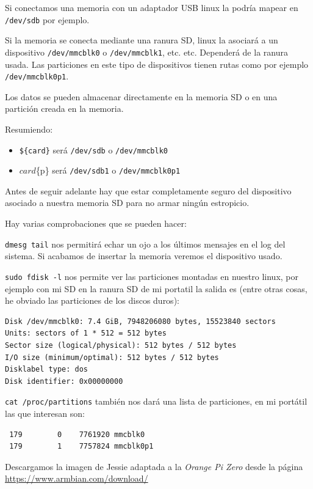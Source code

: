 \documentclass[12pt,spanish,]{article}
\providecommand{\tightlist}{%
  \setlength{\itemsep}{0pt}\setlength{\parskip}{0pt}}
\begin{document}
Si conectamos una memoria con un adaptador USB linux la podría mapear en
\texttt{/dev/sdb} por ejemplo.

Si la memoria se conecta mediante una ranura SD, linux la asociará a un
dispositivo \texttt{/dev/mmcblk0} o \texttt{/dev/mmcblk1}, etc. etc.
Dependerá de la ranura usada. Las particiones en este tipo de
dispositivos tienen rutas como por ejemplo \texttt{/dev/mmcblk0p1}.

Los datos se pueden almacenar directamente en la memoria SD o en una
partición creada en la memoria.

Resumiendo:

\begin{itemize}
\tightlist
\item
  \texttt{\$\{card\}} será \texttt{/dev/sdb} o \texttt{/dev/mmcblk0}
\item
  \({card}\)\{p\} será \texttt{/dev/sdb1} o \texttt{/dev/mmcblk0p1}
\end{itemize}

Antes de seguir adelante hay que estar completamente seguro del
dispositivo asociado a nuestra memoria SD para no armar ningún
estropicio.

Hay varias comprobaciones que se pueden hacer:

\texttt{dmesg\ \textbar{}tail} nos permitirá echar un ojo a los últimos
mensajes en el log del sistema. Si acabamos de insertar la memoria
veremos el dispositivo usado.

\texttt{sudo\ fdisk\ -l} nos permite ver las particiones montadas en
nuestro linux, por ejemplo con mi SD en la ranura SD de mi portatil la
salida es (entre otras cosas, he obviado las particiones de los discos
duros):

\begin{verbatim}
Disk /dev/mmcblk0: 7.4 GiB, 7948206080 bytes, 15523840 sectors
Units: sectors of 1 * 512 = 512 bytes
Sector size (logical/physical): 512 bytes / 512 bytes
I/O size (minimum/optimal): 512 bytes / 512 bytes
Disklabel type: dos
Disk identifier: 0x00000000
\end{verbatim}

\texttt{cat\ /proc/partitions} también nos dará una lista de
particiones, en mi portátil las que interesan son:

\begin{verbatim}
 179        0    7761920 mmcblk0
 179        1    7757824 mmcblk0p1
\end{verbatim}

Descargamos la imagen de Jessie adaptada a la \emph{Orange Pi Zero}
desde la página \url{https://www.armbian.com/download/}
\end{document}
